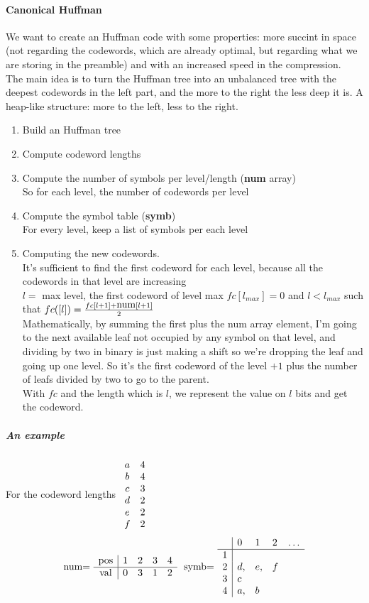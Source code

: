 \documentclass[10pt]{report}
\begin{document}
\paragraph{Canonical Huffman} We want to create an Huffman code with some properties: more succint in space (not regarding the codewords, which are already optimal, but regarding what we are storing in the preamble) and with an increased speed in the compression.\\
The main idea is to turn the Huffman tree into an unbalanced tree with the deepest codewords in the left part, and the more to the right the less deep it is. A heap-like structure: more to the left, less to the right.
\begin{enumerate}
	\item Build an Huffman tree 
	\item Compute codeword lengths
	\item Compute the number of symbols per level/length (\textbf{num} array)\\
	So for each level, the number of codewords per level
	\item Compute the symbol table (\textbf{symb})\\
	For every level, keep a list of symbols per each level
	\item Computing the new codewords.\\
	It's sufficient to find the first codeword for each level, because all the codewords in that level are increasing\\
	$l =$ max level, the first codeword of level max $fc[l_{max}] = 0$ and $l<l_{max}$ such that $fc([l])=\frac{fc[l+1]+\hbox{num}[l+1]}{2}$\\
	Mathematically, by summing the first plus the num array element, I'm going to the next available leaf not occupied by any symbol on that level, and dividing by two in binary is just making a shift so we're dropping the leaf and going up one level. So it's the first codeword of the level $+1$ plus the number of leafs divided by two to go to the parent.\\
	With $fc$ and the length which is $l$, we represent the value on $l$ bits and get the codeword.
\end{enumerate}
\subparagraph{An example} For the codeword lengths $\begin{array}{c c}
a & 4\\
b & 4\\
c & 3\\
d & 2\\
e & 2\\
f & 2
\end{array}$ $$\hbox{num= }\begin{array}{c| c c c c}
\hbox{pos}&1&2&3&4\\
\hline
\hbox{val}&0&3&1&2\\
\end{array}\:\:\:\hbox{symb= }\begin{array}{c| l l l l}
&0&1&2&\ldots\\
\hline
1&\\
2&d,&e,&f\\
3&c\\
4&a,&b
\end{array}$$
\end{document}
